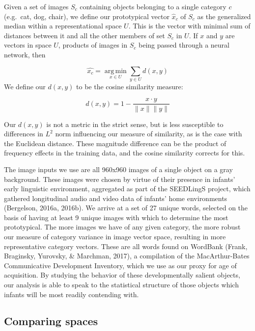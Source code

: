 \documentclass[10pt, letterpaper]{article}
\begin{document}
Given a set of images \(S_c\) containing objects belonging to a single
category \(c\) (e.g.~cat, dog, chair), we define our prototypical vector
\(\hat{x}_c\) of \(S_c\) as the generalized median within a
representational space \(U\). This is the vector with minimal sum of
distances between it and all the other members of set \(S_c\) in \(U\).
If \(x\) and \(y\) are vectors in space \(U\), products of images in
\(S_c\) being passed through a neural network, then

\[
 \hat{x_c} = \operatorname*{arg\,min}_{x\in U} \sum_{y\in U} d(x, y)
\] We define our \(d(x, y)\) to be the cosine similarity measure:

\[
d(x, y) = 1 - \frac{x\cdot y}{\|x\|\|y\|}
\]

Our \(d(x, y)\) is not a metric in the strict sense, but is less
susceptible to differences in \(L^2\) norm influencing our measure of
similarity, as is the case with the Euclidean distance. These magnitude
difference can be the product of frequency effects in the training data,
and the cosine similarity corrects for this.

The image inputs we use are all 960x960 images of a single object on a
gray background. These images were chosen by virtue of their presence in
infants' early linguistic environment, aggregated as part of the
SEEDLingS project, which gathered longitudinal audio and video data of
infants' home environments (Bergelson, 2016a, 2016b). We arrive at a set
of 27 unique words, selected on the basis of having at least 9 unique
images with which to determine the most prototypical. The more images we
have of any given category, the more robust our measure of category
variance in image vector space, resulting in more representative
category vectors. These are all words found on WordBank (Frank,
Braginsky, Yurovsky, \& Marchman, 2017), a compilation of the
MacArthur-Bates Communicative Development Inventory, which we use as our
proxy for age of acquisition. By studying the behavior of these
developmentally salient objects, our analysis is able to speak to the
statistical structure of those objects which infants will be most
readily contending with.

\subsection{Comparing spaces}\label{comparing-spaces}
\end{document}
